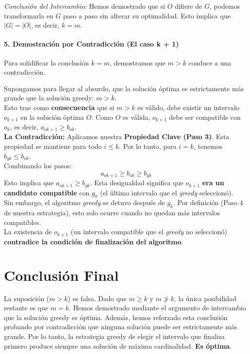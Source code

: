 \documentclass[12pt, a4paper]{article}
\begin{document}
\textit{Conclusión del Intercambio:} Hemos demostrado que si $O$ difiere de $G$, podemos transformarla 
en $G$ paso a paso sin alterar su optimalidad. Esto implica que $|G| = |O|$, es decir, $k = m$.

\paragraph{5. Demostración por Contradicción (El caso k + 1)}
Para solidificar la conclusión $k=m$, demostramos que $m > k$ conduce a una contradicción.

Supongamos para llegar al absurdo, que la solución óptima es estrictamente más grande que la solución greedy: $m > k$.\\

Esto trae como \textbf{consecuencia} que si $m > k$ es válido, debe existir un intervalo $o_{k+1}$ en 
la solución óptima $O$. Como $O$ es válida, $o_{k+1}$ debe ser compatible con $o_k$, es decir, $a_{ok+1} \ge b_{ok}$.\\

\textbf{La Contradicción:} Aplicamos nuestra \textbf{Propiedad Clave (Paso 3)}. 
Esta propiedad se mantiene para todo $i \le k$. Por lo tanto, para $i=k$, tenemos $b_{gk} \le b_{ok}$.\\
Combinando los pasos:   \[ a_{ok+1} \ge b_{ok} \ge b_{gk} \]
Esto implica que $a_{ok+1} \ge b_{gk}$. Esta desigualdad significa que $o_{k+1}$ 
\textbf{era un candidato compatible} con $g_k$ (el último intervalo que el \textit{greedy} seleccionó).\\

Sin embargo, el algoritmo \textit{greedy} se detuvo después de $g_k$. Por definición (Paso 4 de nuestra estrategia), esto solo ocurre cuando no quedan más intervalos compatibles.\\
La existencia de $o_{k+1}$ (un intervalo compatible que el \textit{greedy} no seleccionó) 
\textbf{contradice la condición de finalización del algoritmo}.\\


\section{\textbf{Conclusión Final}} 

La suposición ($m > k$) es falsa. Dado que $m \ge k$ y $m \ngtr k$, la única posibilidad restante es que $m=k$.
Hemos demostrado mediante el argumento de intercambio que la solución greedy es óptima. 
Además, hemos reforzado esta conclusión probando por contradicción que ninguna solución puede ser 
estrictamente más grande. Por lo tanto, la estrategia greedy de elegir el intervalo que finaliza 
primero produce siempre una solución de máxima cardinalidad. \textbf{Es óptima}.
\end{document}

